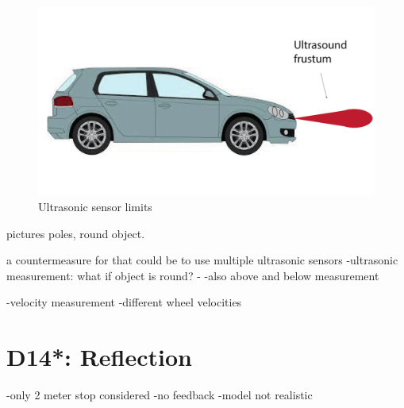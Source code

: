 \begin{figure}[H]
\centering
\includegraphics[width=.7\textwidth]{images/us_drawing2.pdf}
\caption{Ultrasonic sensor limits}
\label{fig:D13_USLimitSide}
\end{figure}
pictures poles, round object.

a countermeasure for that could be to use multiple ultrasonic sensors 
-ultrasonic measurement: what if object is round?
-
-also above and below measurement

-velocity measurement
-different wheel velocities
\chapter{D14*: Reflection}\label{cha:D14}
-only 2 meter stop considered
-no feedback
-model not realistic